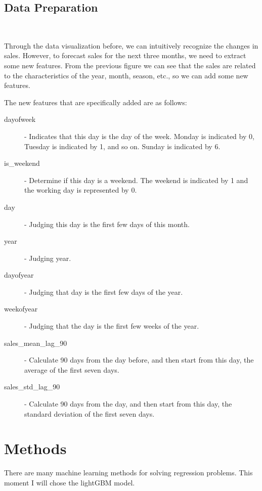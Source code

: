 \subsection{Data Preparation}
\ 

Through the data visualization before, we can intuitively 
recognize the changes in sales. However, to forecast sales for the 
next three months, we need to extract some new features. From the
previous figure we can see that the sales are related to the 
characteristics of the year, month, season, etc., so we can add some 
new features.

The new features that are specifically added are as follows:
\ 
\begin{description}
  \item [dayofweek] -  Indicates that this day is the day of the week. Monday is \hspace*{1.8cm} indicated by 0, Tuesday is indicated by 1, and so on.
                       Sunday \hspace*{1.8cm} is indicated by 6.
  \item [is\_weekend] - Determine if this day is a weekend. The weekend is indicated \hspace*{1.85cm} by 1 and the working day is represented by 0.
  \item [day] - Judging this day is the first few days of this month.
  \item [year] - Judging year.
  \item [dayofyear] - Judging that day is the first few days of the year.
  \item [weekofyear] - Judging that the day is the first few weeks of the year.
  \item [sales\_mean\_lag\_90] - Calculate 90 days from the day before, and then start \hspace*{3.1cm} from this day, the average of the first 
  seven days.
  \item [sales\_std\_lag\_90] - Calculate 90 days from the day, and then start from this \hspace*{2.7cm} day, the standard deviation of the 
  first seven days.
\end{description}

\section{Methods}

There are many machine learning methods for solving regression problems. This moment I will chose the lightGBM model.

